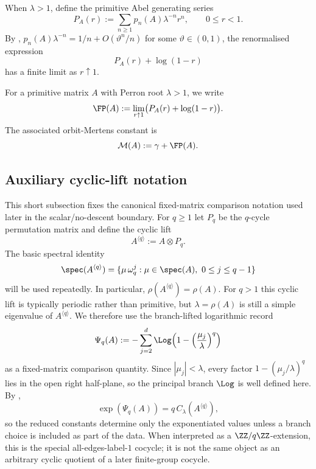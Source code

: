 When \(\lambda>1\), define the primitive Abel generating series
\[
  P_A(r):=\sum_{n\ge 1}p_n(A)\lambda^{-n}r^n,
  \qquad 0\le r<1.
\]
By ,
\(p_n(A)\lambda^{-n}=1/n+O(\vartheta^n/n)\) for some
\(\vartheta\in(0,1)\), the renormalised expression
\[
  P_A(r)+\log(1-r)
\]
has a finite limit as \(r\uparrow 1\).

\begin{definition}\label{def:abel-finite-part}
For a primitive matrix \(A\) with Perron root \(\lambda>1\), we write
\[
  \FP(A):=\lim_{r\uparrow 1}\bigl(P_A(r)+\log(1-r)\bigr).
\]
The associated orbit-Mertens constant is
\[
  \mathcal M(A):=\gamma+\FP(A).
\]
\end{definition}

\subsection{Auxiliary cyclic-lift notation}

This short subsection fixes the canonical fixed-matrix comparison notation
used later in the scalar/no-descent boundary.  For \(q\ge 1\) let \(P_q\) be the \(q\)-cycle permutation matrix and
define the cyclic lift
\begin{equation}\label{eq:cyclic-lift-def}
  A^{\langle q\rangle}:=A\otimes P_q.
\end{equation}
The basic spectral identity
\[
  \spec(A^{\langle q\rangle})
  =\{\mu\,\omega_q^j:\mu\in\spec(A),\ 0\le j\le q-1\}
\]
will be used repeatedly. In particular,
\(\rho(A^{\langle q\rangle})=\rho(A)\). For \(q>1\) this cyclic lift is
typically periodic rather than primitive, but \(\lambda=\rho(A)\) is
still a simple eigenvalue of \(A^{\langle q\rangle}\). We therefore use
the branch-lifted logarithmic record
\[
  \Psi_q(A):=
  -\sum_{j=2}^d
    \Log\!\left(1-\left(\frac{\mu_j}{\lambda}\right)^q\right)
\]
as a fixed-matrix comparison quantity. Since \(|\mu_j|<\lambda\), every
factor \(1-(\mu_j/\lambda)^q\) lies in the open right half-plane, so the
principal branch \(\Log\) is well defined here. By
,
\[
  \exp(\Psi_q(A))=q\,C_\lambda(A^{\langle q\rangle}),
\]
so the reduced constants determine only the exponentiated values unless
a branch choice is included as part of the data.
When interpreted as a \(\ZZ/q\ZZ\)-extension, this is the special
all-edges-label-\(1\) cocycle; it is not the same object as an arbitrary
cyclic quotient of a later finite-group cocycle.

